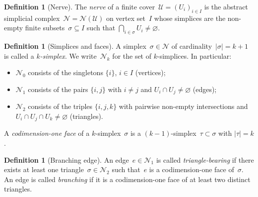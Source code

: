 \documentclass[11pt,a4paper]{article}
\theoremstyle{plain}
\theoremstyle{definition}
\newtheorem{definition}[theorem]{Definition}
\theoremstyle{remark}
\newcommand{\cU}{\mathcal{U}}
\newcommand{\cN}{\mathcal{N}}
\begin{document}
\begin{definition}[Nerve]
\label{def:nerve}
The \emph{nerve} of a finite cover~$\cU = (U_i)_{i \in I}$ is the abstract
simplicial complex~$\cN = \cN(\cU)$ on vertex set~$I$ whose simplices are
the non-empty finite subsets~$\sigma \subseteq I$ such that
$\bigcap_{i \in \sigma} U_i \neq \varnothing$.
\end{definition}

\begin{definition}[Simplices and faces]
\label{def:simplices}
A simplex~$\sigma \in \cN$ of cardinality~$|\sigma| = k + 1$ is called a
\emph{$k$-simplex}. We write~$\cN_k$ for the set of $k$-simplices.
In particular:
\begin{itemize}[nosep]
  \item $\cN_0$ consists of the singletons $\{i\}$, $i \in I$ (vertices);
  \item $\cN_1$ consists of the pairs $\{i,j\}$ with $i \neq j$ and
        $U_i \cap U_j \neq \varnothing$ (edges);
  \item $\cN_2$ consists of the triples $\{i,j,k\}$ with pairwise non-empty
        intersections and $U_i \cap U_j \cap U_k \neq \varnothing$ (triangles).
\end{itemize}
A \emph{codimension-one face} of a $k$-simplex~$\sigma$ is a
$(k{-}1)$-simplex~$\tau \subset \sigma$ with $|\tau| = k$.
\end{definition}

\begin{definition}[Branching edge]
\label{def:branching}
An edge~$e \in \cN_1$ is called \emph{triangle-bearing} if there exists
at least one triangle~$\sigma \in \cN_2$ such that~$e$ is a codimension-one
face of~$\sigma$. An edge is called \emph{branching} if it is a
codimension-one face of at least two distinct triangles.
\end{definition}
\end{document}
